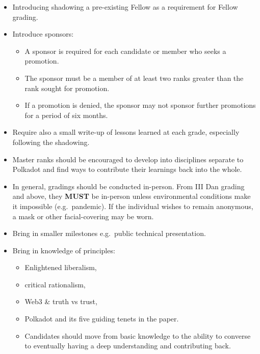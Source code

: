 \documentclass[9pt,oneside]{amsart}
\begin{document}
\begin{itemize}
  \item Introducing shadowing a pre-existing Fellow as a requirement for Fellow grading.
  \item Introduce sponsors:
    \begin{itemize}
      \item A sponsor is required for each candidate or member who seeks a promotion.
      \item The sponsor must be a member of at least two ranks greater than the rank sought for promotion.
      \item If a promotion is denied, the sponsor may not sponsor further promotions for a period of six months.
    \end{itemize}
  \item Require also a small write-up of lessons learned at each grade, especially following the shadowing.
  \item Master ranks should be encouraged to develop into disciplines separate to Polkadot and find ways to contribute their learnings back into the whole.
  \item In general, gradings should be conducted in-person. From III Dan grading and above, they \textbf{MUST} be in-person unless environmental conditions make it impossible (e.g.~pandemic). If the individual wishes to remain anonymous, a mask or other facial-covering may be worn.
  \item Bring in smaller milestones e.g.~public technical presentation.
  \item Bring in knowledge of principles:
    \begin{itemize}
    \item Enlightened liberalism,
    \item critical rationalism,
    \item Web3 \& truth vs trust,
    \item Polkadot and its five guiding tenets in the paper.
    \item Candidates should move from basic knowledge to the ability to converse to eventually having a deep understanding and contributing back.
  \end{itemize}
\end{itemize}
\end{document}
